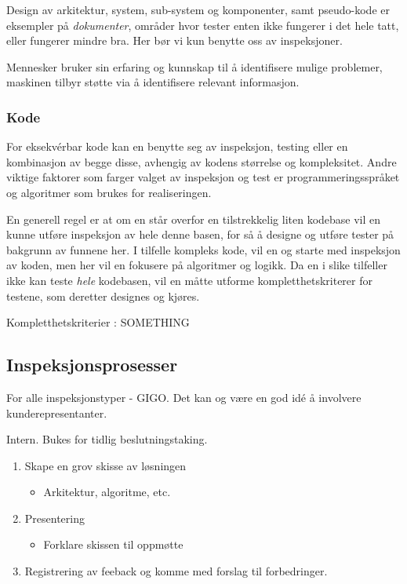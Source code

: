 Design av arkitektur, system, sub-system og komponenter, samt
pseudo-kode er eksempler på \emph{dokumenter}, områder hvor tester enten
ikke fungerer i det hele tatt, eller fungerer mindre bra. Her bør vi kun
benytte oss av inspeksjoner.

Mennesker bruker sin erfaring og kunnskap til å identifisere mulige
problemer, maskinen tilbyr støtte via å identifisere relevant
informasjon.

\subsubsection{Kode}

For eksekvérbar kode kan en benytte seg av inspeksjon, testing eller en
kombinasjon av begge disse, avhengig av kodens størrelse og
kompleksitet. Andre viktige faktorer som farger valget av inspeksjon og
test er programmeringsspråket og algoritmer som brukes for
realiseringen.

En generell regel er at om en står overfor en tilstrekkelig liten
kodebase vil en kunne utføre inspeksjon av hele denne basen, for så å
designe og utføre tester på bakgrunn av funnene her. I tilfelle kompleks
kode, vil en og starte med inspeksjon av koden, men her vil en fokusere
på algoritmer og logikk. Da en i slike tilfeller ikke kan teste
\emph{hele} kodebasen, vil en måtte utforme kompletthetskriterer for
testene, som deretter designes og kjøres.

Kompletthetskriterier : SOMETHING

\subsection{Inspeksjonsprosesser}

For alle inspeksjonstyper - GIGO. Det kan og være en god idé å involvere
kunderepresentanter.


Intern. Bukes for tidlig beslutningstaking.

\begin{enumerate}[1.]
\item
  Skape en grov skisse av løsningen
  \begin{itemize}
  \item
    Arkitektur, algoritme, etc.
  \end{itemize}
\item
  Presentering
  \begin{itemize}
  \item
    Forklare skissen til oppmøtte
  \end{itemize}
\item
  Registrering av feeback og komme med forslag til forbedringer.
\end{enumerate}
